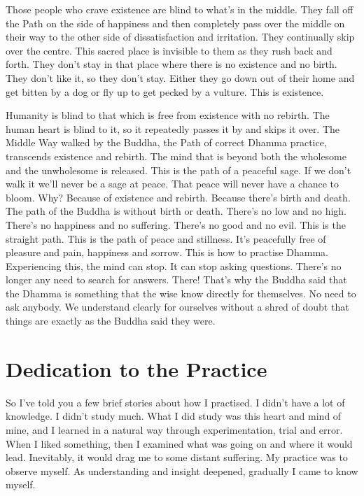 Those people who crave existence are blind to what's in the middle. They fall off the Path on the side of happiness and then completely pass over the middle on their way to the other side of dissatisfaction and irritation. They continually skip over the centre. This sacred place is invisible to them as they rush back and forth. They don't stay in that place where there is no existence and no birth. They don't like it, so they don't stay. Either they go down out of their home and get bitten by a dog or fly up to get pecked by a vulture. This is existence.

Humanity is blind to that which is free from existence with no rebirth. The human heart is blind to it, so it repeatedly passes it by and skips it over. The Middle Way walked by the Buddha, the Path of correct Dhamma practice, transcends existence and rebirth. The mind that is beyond both the wholesome and the unwholesome is released. This is the path of a peaceful sage. If we don't walk it we'll never be a sage at peace. That peace will never have a chance to bloom. Why? Because of existence and rebirth. Because there's birth and death. The path of the Buddha is without birth or death. There's no low and no high. There's no happiness and no suffering. There's no good and no evil. This is the straight path. This is the path of peace and stillness. It's peacefully free of pleasure and pain, happiness and sorrow. This is how to practise Dhamma. Experiencing this, the mind can stop. It can stop asking questions. There's no longer any need to search for answers. There! That's why the Buddha said that the Dhamma is something that the wise know directly for themselves. No need to ask anybody. We understand clearly for ourselves without a shred of doubt that things are exactly as the Buddha said they were.
\vspace*{\baselineskip}

\section*{Dedication to the Practice}

So I've told you a few brief stories about how I practised. I didn't have a lot of knowledge. I didn't study much. What I did study was this heart and mind of mine, and I learned in a natural way through experimentation, trial and error. When I liked something, then I examined what was going on and where it would lead. Inevitably, it would drag me to some distant suffering. My practice was to observe myself. As understanding and insight deepened, gradually I came to know myself.

